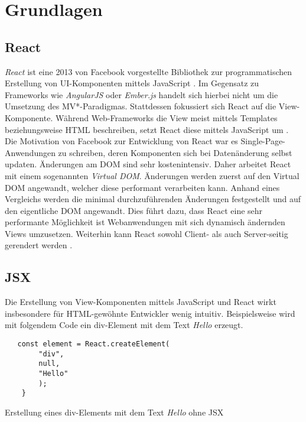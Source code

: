 \section{Grundlagen}

\subsection{React}
\textit{React} ist eine 2013 von Facebook vorgestellte Bibliothek zur programmatischen Erstellung von UI-Komponenten mittels JavaScript \cite{facebook_inc._react_2016}. Im Gegensatz zu Frameworks wie \textit{AngularJS} oder \textit{Ember.js} handelt sich hierbei nicht um die Umsetzung des MV*-Paradigmas. Stattdessen fokussiert sich React auf die View-Komponente. Während Web-Frameworks die View meist mittels Templates beziehungsweise HTML beschreiben, setzt React diese mittels JavaScript um \cite{hunt_why_2013}. Die Motivation von Facebook zur Entwicklung von React war es Single-Page-Anwendungen zu schreiben, deren Komponenten sich bei Datenänderung selbst updaten. Änderungen am DOM sind sehr kostenintensiv. Daher arbeitet React mit einem sogenannten \textit{Virtual DOM}. Änderungen werden zuerst auf den Virtual DOM angewandt, welcher diese performant verarbeiten kann. Anhand eines Vergleichs werden die minimal durchzuführenden Änderungen festgestellt und auf den eigentliche DOM angewandt. Dies führt dazu, dass React eine sehr performante Möglichkeit ist Webanwendungen mit sich dynamisch ändernden Views umzusetzen. Weiterhin kann React sowohl Client- als auch Server-seitig gerendert werden \cite{hunt_why_2013}.
 
\subsection{JSX}
Die Erstellung von View-Komponenten mittels JavaScript und React wirkt insbesondere für HTML-gewöhnte Entwickler wenig intuitiv. Beispielsweise wird mit folgendem Code ein div-Element mit dem Text \textit{Hello} erzeugt.
\begin{listing}[H]
    \begin{verbatim}
   const element = React.createElement(
        "div",
        null,
        "Hello"
        );
    }
    \end{verbatim}
    \caption{Erstellung eines div-Elements mit dem Text \textit{Hello} ohne JSX}
    \label{lst:jsx_without_jsx}
\end{listing}

